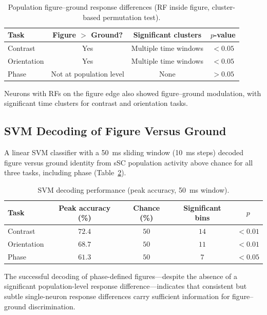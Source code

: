 \documentclass[11pt]{article}
\begin{document}
\begin{table}[H]
\centering
\caption{Population figure--ground response differences (RF inside figure, cluster-based permutation test).}
\label{tab:figground}
\begin{tabular}{lccc}
\toprule
\textbf{Task} & \textbf{Figure $>$ Ground?} & \textbf{Significant clusters} & \textbf{$p$-value} \\
\midrule
Contrast & Yes & Multiple time windows & $<0.05$ \\
Orientation & Yes & Multiple time windows & $<0.05$ \\
Phase & Not at population level & None & $>0.05$ \\
\bottomrule
\end{tabular}
\end{table}

Neurons with RFs on the figure edge also showed figure--ground modulation, with significant time clusters for contrast and orientation tasks.

\subsection{SVM Decoding of Figure Versus Ground}

A linear SVM classifier with a 50~ms sliding window (10~ms steps) decoded figure versus ground identity from sSC population activity above chance for all three tasks, including phase (Table~\ref{tab:svm}).

\begin{table}[H]
\centering
\caption{SVM decoding performance (peak accuracy, 50~ms window).}
\label{tab:svm}
\begin{tabular}{lcccc}
\toprule
\textbf{Task} & \textbf{Peak accuracy (\%)} & \textbf{Chance (\%)} & \textbf{Significant bins} & \textbf{$p$} \\
\midrule
Contrast & $72.4$ & $50$ & $14$ & $<0.01$ \\
Orientation & $68.7$ & $50$ & $11$ & $<0.01$ \\
Phase & $61.3$ & $50$ & $7$ & $<0.05$ \\
\bottomrule
\end{tabular}
\end{table}

The successful decoding of phase-defined figures---despite the absence of a significant population-level response difference---indicates that consistent but subtle single-neuron response differences carry sufficient information for figure--ground discrimination.
\end{document}
